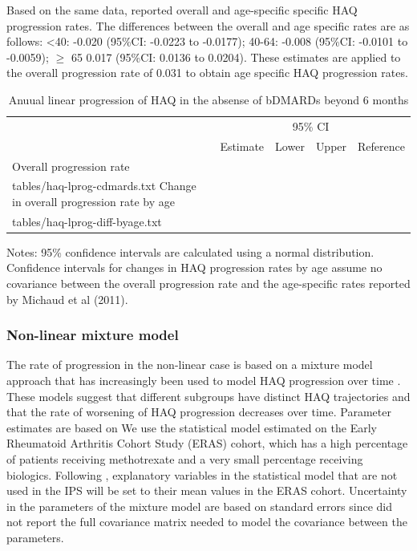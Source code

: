 \documentclass[11pt,final,fleqn]{article}\usepackage[]{graphicx}\usepackage[]{color}
\makeatletter
\theoremstyle{plain}
\newcommand*\ExpandableInput[1]{\@@input#1 }
\makeatother
\begin{document}
Based on the same data, \citet{michaud2011treatment} reported overall and age-specific specific HAQ progression rates. The differences between the overall and age specific rates are as follows: \textless{}40: -0.020 (95\%CI: -0.0223 to -0.0177); 40-64: -0.008 (95\%CI: -0.0101 to -0.0059); \(\geq\) 65 0.017 (95\%CI: 0.0136 to 0.0204). These estimates are applied to the overall progression rate of 0.031 to obtain age specific HAQ progression rates.



\begin{table}[!ht]
\begin{center}
\begin{threeparttable}
\caption{Anuual linear progression of HAQ in the absense of bDMARDs beyond 6 months} \label{tbl:haq-lprog}
\footnotesize
\begin{tabularx}{\textwidth}{@{\extracolsep{\fill}}lrrrl}
\hline
\multicolumn{2}{l}{} & \multicolumn{2}{c}{95\% CI} & \multicolumn{1}{l}{} \\
\cmidrule{3-4} 
\multicolumn{1}{l}{} & \multicolumn{1}{r}{Estimate} & \multicolumn{1}{r}{Lower} & \multicolumn{1}{r}{Upper} & \multicolumn{1}{l}{Reference} \\
\hline
Overall progression rate \\
\ExpandableInput{tables/haq-lprog-cdmards.txt}
Change in overall progression rate by age \\
\ExpandableInput{tables/haq-lprog-diff-byage.txt}
\hline
\end{tabularx}
\scriptsize
Notes: 95\% confidence intervals are calculated using a normal distribution. Confidence intervals for changes in HAQ progression rates by age assume no covariance between the overall progression rate and the age-specific rates reported by Michaud et al (2011).
\end{threeparttable}
\end{center}
\end{table}

\subsubsection{Non-linear mixture model} \label{sec:haq-mixture}

The rate of progression in the non-linear case is based on a mixture model approach that has increasingly been used to model HAQ progression over time \citep{stevenson2016adalimumab, norton2013trajectories, norton2014health}. These models suggest that different subgroups have distinct HAQ trajectories and that the rate of worsening of HAQ progression decreases over time. Parameter estimates are based on We use the statistical model estimated on the Early Rheumatoid Arthritis Cohort Study (ERAS) cohort, which has a high percentage of patients receiving methotrexate and a very small percentage receiving biologics. Following \citet{stevenson2016adalimumab}, explanatory variables in the statistical model that are not used in the IPS will be set to their mean values in the ERAS cohort. Uncertainty in the parameters of the mixture model are based on standard errors since \citet{norton2013trajectories} did not report the full covariance matrix needed to model the covariance between the parameters.
\end{document}

